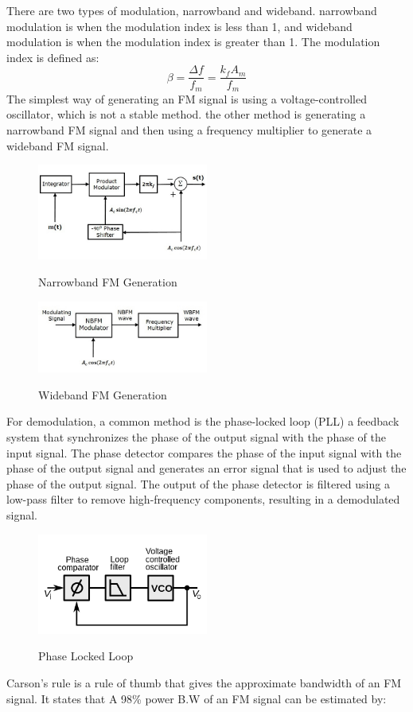 \documentclass[12pt]{article}
\begin{document}
There are two types of modulation, narrowband and wideband. narrowband modulation is when the modulation index is less than 1, and wideband modulation is when the modulation index is greater than 1. The modulation index is defined as:
\begin{equation}
    \beta = \frac{\Delta f}{f_m} = \frac{k_f A_m}{f_m}
\end{equation}
The simplest way of generating an FM signal is using a voltage-controlled oscillator, which is not a stable method. the other method is generating a narrowband FM signal and then using a frequency multiplier to generate a wideband FM signal.

\begin{figure}[H]
    \centering
    \includegraphics[width=0.5\textwidth]{assets/img/nbfm_modulator.jpg}
    \caption{Narrowband FM Generation}
    \cite{tutorialspoint_fm_modulators}
\end{figure}
\begin{figure}[H]
    \centering
    \includegraphics[width=0.5\textwidth]{assets/img/indirect_method.jpg}
    \caption{Wideband FM Generation}
    \cite{tutorialspoint_fm_modulators}
\end{figure}
For demodulation, a common method is the phase-locked loop (PLL) a feedback system that synchronizes the phase of the output signal with the phase of the input signal. The phase detector compares the phase of the input signal with the phase of the output signal and generates an error signal that is used to adjust the phase of the output signal. The output of the phase detector is filtered using a low-pass filter to remove high-frequency components, resulting in a demodulated signal.
\begin{figure}[H]
    \centering
    \includegraphics[width=0.5\textwidth]{assets/img/PLL.png}
    \caption{Phase Locked Loop}
    \cite{wikipedia_pll}
\end{figure}
Carson's rule is a rule of thumb that gives the approximate bandwidth of an FM signal. It states that A 98\% power B.W of an FM signal can be estimated by:
\end{document}
